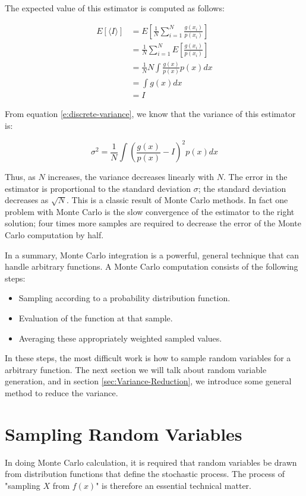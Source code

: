 The expected value of this estimator is computed as follows:

\begin{equation}
	\begin{aligned}
		E[\langle I\rangle]&=E[\frac{1}{N}\sum_{i=1}^{N}\frac{g(x_i)}{p(x_i)}]\\
		&=\frac{1}{N}\sum_{i=1}^{N}E[\frac{g(x_i)}{p(x_i)}]\\
		&=\frac{1}{N}N\int \frac{g(x)}{p(x)}p(x)dx\\
		&=\int g(x)dx\\
		&=I
	\end{aligned}
\end{equation}

From equation \ref{e:discrete-variance}, we know that the variance of this estimator is:

\begin{equation}\label{e:variance}
	\sigma^2=\frac{1}{N}\int(\frac{g(x)}{p(x)}-I)^2p(x)dx
\end{equation}

Thus, as $N$ increases, the variance decreases linearly with $N$. The error in the estimator is proportional to the standard deviation $\sigma$; the standard deviation decreases as $\sqrt{N}$. This is a classic result of Monte Carlo methods. In fact one problem with Monte Carlo is the slow convergence of the estimator to the right solution; four times more samples are required to decrease the error of the Monte Carlo computation by half.

In a summary, Monte Carlo integration is a powerful, general technique that can handle arbitrary functions. A Monte Carlo computation consists of the following steps:

\begin{itemize}
	\item Sampling according to a probability distribution function.
	\item Evaluation of the function at that sample.
	\item Averaging these appropriately weighted sampled values.
\end{itemize}

In these steps, the most difficult work is how to sample random variables for a arbitrary function. The next section we will talk about random variable generation, and in section \ref{sec:Variance-Reduction}, we introduce some general method to reduce the variance.



\section{Sampling Random Variables}\label{sec:Sampling-Random-Variables}
In doing Monte Carlo calculation, it is required that random variables be drawn from distribution functions that define the stochastic process. The process of "sampling $X$ from $f(x)$" is therefore an essential technical matter.

